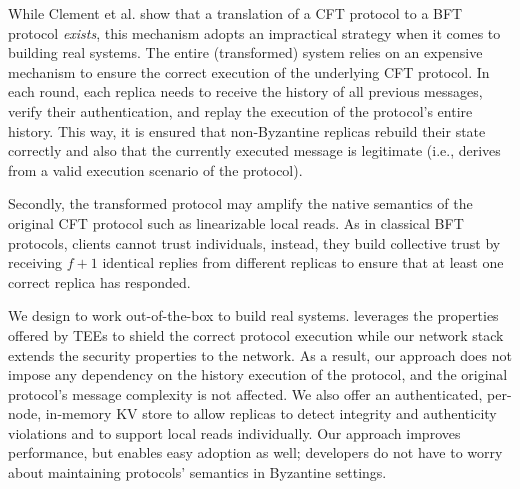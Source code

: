 While Clement et al. show that a translation of a CFT protocol to a BFT protocol {\em exists}, this mechanism adopts an impractical strategy when it comes to building real systems. The entire (transformed) system relies on an expensive mechanism to ensure the correct execution of the underlying CFT protocol. In each round, each replica needs to receive the history of all previous messages, verify their authentication, and replay the execution of the protocol's entire history. This way, it is ensured that non-Byzantine replicas rebuild their state correctly and also that the currently executed message is legitimate (i.e., derives from a valid execution scenario of the protocol). 


Secondly, the transformed protocol may amplify the native semantics of the original CFT protocol such as linearizable local reads. As in classical BFT protocols, clients cannot trust individuals, instead, they build collective trust by receiving $f+1$ identical replies from different replicas to ensure that at least one correct replica has responded. 


We design \projecttitle{} to work out-of-the-box to build real systems. \projecttitle{} leverages the properties offered by TEEs to shield the correct protocol execution while our network stack extends the security properties to the network. As a result, our approach does not impose any dependency on the history execution of the protocol, and the original protocol's message complexity is not affected. We also offer an authenticated, per-node, in-memory KV store to allow replicas to detect integrity and authenticity violations and to support local reads individually. Our approach improves performance, but enables easy adoption as well; developers do not have to worry about maintaining protocols' semantics in Byzantine settings.


